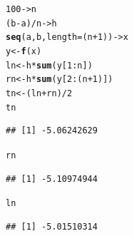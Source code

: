 \documentclass[onecolumn,11pt]{book}\usepackage[]{graphicx}\usepackage[]{color}
\makeatletter
\newcommand{\hlnum}[1]{\textcolor[rgb]{0.686,0.059,0.569}{#1}}%
\newcommand{\hlopt}[1]{\textcolor[rgb]{0,0,0}{#1}}%
\newcommand{\hlstd}[1]{\textcolor[rgb]{0.345,0.345,0.345}{#1}}%
\newcommand{\hlkwb}[1]{\textcolor[rgb]{0.69,0.353,0.396}{#1}}%
\newcommand{\hlkwc}[1]{\textcolor[rgb]{0.333,0.667,0.333}{#1}}%
\newcommand{\hlkwd}[1]{\textcolor[rgb]{0.737,0.353,0.396}{\textbf{#1}}}%
\newenvironment{kframe}{%
 \def\at@end@of@kframe{}%
 \ifinner\ifhmode%
  \def\at@end@of@kframe{\end{minipage}}%
  \begin{minipage}{\columnwidth}%
 \fi\fi%
 \def\FrameCommand##1{\hskip\@totalleftmargin \hskip-\fboxsep
 \colorbox{shadecolor}{##1}\hskip-\fboxsep
     \hskip-\linewidth \hskip-\@totalleftmargin \hskip\columnwidth}%
 \MakeFramed {\advance\hsize-\width
   \@totalleftmargin\z@ \linewidth\hsize
   \@setminipage}}%
 {\par\unskip\endMakeFramed%
 \at@end@of@kframe}
\newenvironment{knitrout}{}{} %
\makeatother
\begin{document}
\begin{knitrout}
\color{fgcolor}\begin{kframe}
\begin{alltt}
\hlnum{100}\hlkwb{->}\hlstd{n}
\hlstd{(b}\hlopt{-}\hlstd{a)}\hlopt{/}\hlstd{n}\hlkwb{->}\hlstd{h}
\hlkwd{seq}\hlstd{(a,b,}\hlkwc{length}\hlstd{=(n}\hlopt{+}\hlnum{1}\hlstd{))}\hlkwb{->}\hlstd{x}
\hlstd{y}\hlkwb{<-}\hlkwd{f}\hlstd{(x)}
\hlstd{ln}\hlkwb{<-}\hlstd{h}\hlopt{*}\hlkwd{sum}\hlstd{(y[}\hlnum{1}\hlopt{:}\hlstd{n])}
\hlstd{rn}\hlkwb{<-}\hlstd{h}\hlopt{*}\hlkwd{sum}\hlstd{(y[}\hlnum{2}\hlopt{:}\hlstd{(n}\hlopt{+}\hlnum{1}\hlstd{)])}
\hlstd{tn}\hlkwb{<-}\hlstd{(ln}\hlopt{+}\hlstd{rn)}\hlopt{/}\hlnum{2}
\hlstd{tn}
\end{alltt}
\begin{verbatim}
## [1] -5.06242629
\end{verbatim}
\begin{alltt}
\hlstd{rn}
\end{alltt}
\begin{verbatim}
## [1] -5.10974944
\end{verbatim}
\begin{alltt}
\hlstd{ln}
\end{alltt}
\begin{verbatim}
## [1] -5.01510314
\end{verbatim}
\end{kframe}
\end{knitrout}
\end{document}
